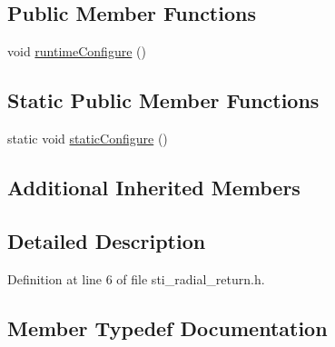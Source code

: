 \subsection*{Public Member Functions}
\begin{DoxyCompactItemize}
\item 
void \hyperlink{structsm__dance__bot_1_1radial__motion__states_1_1StiRadialReturn_a34e0a6de4df8f369424a6be80804a05d}{runtime\+Configure} ()
\end{DoxyCompactItemize}
\subsection*{Static Public Member Functions}
\begin{DoxyCompactItemize}
\item 
static void \hyperlink{structsm__dance__bot_1_1radial__motion__states_1_1StiRadialReturn_aa657a5b660ec8ee8e8f100c52d63551d}{static\+Configure} ()
\end{DoxyCompactItemize}
\subsection*{Additional Inherited Members}


\subsection{Detailed Description}


Definition at line 6 of file sti\+\_\+radial\+\_\+return.\+h.



\subsection{Member Typedef Documentation}
\mbox{\label{structsm__dance__bot_1_1radial__motion__states_1_1StiRadialReturn_a248301e59a9c4f95c9db5349c336ddbc}} 
